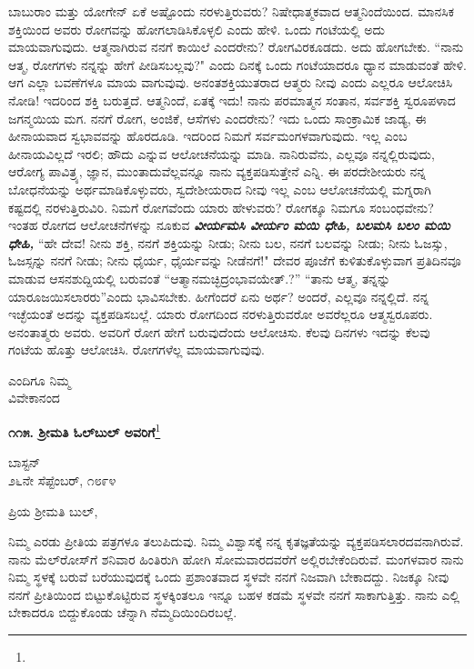 ಬಾಬುರಾಂ ಮತ್ತು ಯೋಗೇನ್ ಏಕೆ ಅಷ್ಟೊಂದು ನರಳುತ್ತಿರುವರು? ನಿಷೇಧಾತ್ಮಕವಾದ ಆತ್ಮನಿಂದೆಯಿಂದ. ಮಾನಸಿಕ ಶಕ್ತಿಯಿಂದ ಅವರು ರೋಗವನ್ನು ಹೋಗಲಾಡಿಸಿಕೊಳ್ಳಲಿ ಎಂದು ಹೇಳಿ. ಒಂದು ಗಂಟೆಯಲ್ಲಿ ಅದು ಮಾಯವಾಗುವುದು. ಆತ್ಮನಾಗಿರುವ ನನಗೆ ಕಾಯಿಲೆ ಎಂದರೇನು? ರೋಗವಿರಕೂಡದು. ಅದು ಹೋಗಬೇಕು. ``ನಾನು ಆತ್ಮ, ರೋಗಗಳು ನನ್ನನ್ನು ಹೇಗೆ ಪೀಡಿಸಬಲ್ಲವು?" ಎಂದು ದಿನಕ್ಕೆ ಒಂದು ಗಂಟೆಯಾದರೂ ಧ್ಯಾನ ಮಾಡುವಂತೆ ಹೇಳಿ. ಆಗ ಎಲ್ಲಾ ಬವಣೆಗಳೂ ಮಾಯ ವಾಗುವುವು. ಅನಂತಶಕ್ತಿಯುತರಾದ ಆತ್ಮರು ನೀವು ಎಂದು ಎಲ್ಲರೂ ಆಲೋಚಿಸಿ ನೋಡಿ! ಇದರಿಂದ ಶಕ್ತಿ ಬರುತ್ತದೆ. ಆತ್ಮನಿಂದೆ, ಏತಕ್ಕೆ ಇದು! ನಾನು ಪರಮಾತ್ಮನ ಸಂತಾನ, ಸರ್ವಶಕ್ತಿ ಸ್ವರೂಪಳಾದ ಜಗನ್ಮಯಿಯ ಮಗ. ನನಗೆ ರೋಗ, ಅಂಜಿಕೆ, ಆಸೆಗಳು ಎಂದರೇನು? ಇದು ಒಂದು ಸಾಂಕ್ರಾಮಿಕ ಜಾಡ್ಯ, ಈ ಹೀನಾಯವಾದ ಸ್ವಭಾವವನ್ನು ಹೊರದೂಡಿ. ಇದರಿಂದ ನಿಮಗೆ ಸರ್ವಮಂಗಳವಾಗುವುದು. ಇಲ್ಲ ಎಂಬ ಹೀನಾಯವಿಲ್ಲದೆ ಇರಲಿ; ಹೌದು ಎನ್ನುವ ಆಲೋಚನೆಯನ್ನು ಮಾಡಿ. ನಾನಿರುವೆನು, ಎಲ್ಲವೂ ನನ್ನಲ್ಲಿರುವುದು, ಆರೋಗ್ಯ ಪಾವಿತ್ರ್ಯ, ಜ್ಞಾನ, ಮುಂತಾದುವೆಲ್ಲವನ್ನೂ ನಾನು ವ್ಯಕ್ತಪಡಿಸುತ್ತೇನೆ ಎನ್ನಿ. ಈ ಪರದೇಶೀಯರು ನನ್ನ ಬೋಧನೆಯನ್ನು ಅರ್ಥಮಾಡಿಕೊಳ್ಳುವರು, ಸ್ವದೇಶೀಯರಾದ ನೀವು ಇಲ್ಲ ಎಂಬ ಆಲೋಚನೆಯಲ್ಲಿ ಮಗ್ನರಾಗಿ ಕಷ್ಟದಲ್ಲಿ ನರಳುತ್ತಿರುವಿರಿ. ನಿಮಗೆ ರೋಗವೆಂದು ಯಾರು ಹೇಳುವರು? ರೋಗಕ್ಕೂ ನಿಮಗೂ ಸಂಬಂಧವೇನು? ಇಂತಹ ರೋಗದ ಆಲೋಚನೆಗಳನ್ನು ನೂಕುವ\enginline{-} \textbf{\textit{ವೀರ್ಯಮಸಿ ವೀರ್ಯಂ ಮಯಿ ಧೇಹಿ, ಬಲಮಸಿ ಬಲಂ ಮಯಿ ಧೇಹಿ, }} ``ಹೇ ದೇವ! ನೀನು ಶಕ್ತಿ, ನನಗೆ ಶಕ್ತಿಯನ್ನು ನೀಡು; ನೀನು ಬಲ, ನನಗೆ ಬಲವನ್ನು ನೀಡು; ನೀನು ಓಜಸ್ಸು, ಓಜಸ್ಸನ್ನು ನನಗೆ ನೀಡು; ನೀನು ಧೈರ್ಯ, ಧೈರ್ಯವನ್ನು ನೀಡೆನಗೆ!" ದೇವರ ಪೂಜೆಗೆ ಕುಳಿತುಕೊಳ್ಳುವಾಗ ಪ್ರತಿದಿನವೂ ಮಾಡುವ ಆಸನಶುದ್ದಿಯಲ್ಲಿ ಬರುವಂತೆ ``ಆತ್ಮಾನಮಚ್ಛಿದ್ರಂಭಾವಯೇತ್.?” ``ತಾನು ಆತ್ಮ, ತನ್ನನ್ನು ಯಾರೂಜಯಿಸಲಾರರು''ಎಂದು ಭಾವಿಸಬೇಕು. ಹೀಗೆಂದರೆ ಏನು ಅರ್ಥ? ಅಂದರೆ, ಎಲ್ಲವೂ ನನ್ನಲ್ಲಿದೆ. ನನ್ನ ಇಚ್ಛೆಯಂತೆ ಅದನ್ನು ವ್ಯಕ್ತಪಡಿಸಬಲ್ಲೆ. ಯಾರು ರೋಗದಿಂದ ನರಳುತ್ತಿರುವರೋ ಅವರೆಲ್ಲರೂ ಆತ್ಮಸ್ವರೂಪರು. ಅನಂತಾತ್ಮರು ಅವರು. ಅವರಿಗೆ ರೋಗ ಹೇಗೆ ಬರುವುದೆಂದು ಆಲೋಚಿಸು. ಕೆಲವು ದಿನಗಳು ಇದನ್ನು ಕೆಲವು ಗಂಟೆಯ ಹೊತ್ತು ಆಲೋಚಿಸಿ. ರೋಗಗಳೆಲ್ಲ ಮಾಯವಾಗುವುವು.

{\flushright
ಎಂದಿಗೂ ನಿಮ್ಮ\\ವಿವೇಕಾನಂದ\par}

\newpage

\begin{center}
\textbf{೧೧೫. ಶ‍್ರೀಮತಿ ಓಲ್‌ಬುಲ್‌ ಅವರಿಗೆ}\footnote{}
\end{center}

\begin{flushright}
ಬಾಸ್ಟನ್\\೨೬ನೇ ಸೆಪ್ಟೆಂಬರ್, ೧೮೯೪
\end{flushright}

\noindent
ಪ್ರಿಯ ಶ‍್ರೀಮತಿ ಬುಲ್,

ನಿಮ್ಮ ಎರಡು ಪ್ರೀತಿಯ ಪತ್ರಗಳೂ ತಲುಪಿದುವು. ನಿಮ್ಮ ವಿಶ್ವಾಸಕ್ಕೆ ನನ್ನ ಕೃತಜ್ಞತೆಯನ್ನು ವ್ಯಕ್ತಪಡಿಸಲಾರದವನಾಗಿರುವೆ. ನಾನು ಮೆಲ್‌ರೋಸ್‌ಗೆ ಶನಿವಾರ ಹಿಂತಿರುಗಿ ಹೋಗಿ ಸೋಮವಾರದವರೆಗೆ ಅಲ್ಲಿರಬೇಕೆಂದಿರುವೆ. ಮಂಗಳವಾರ ನಾನು ನಿಮ್ಮ ಸ್ಥಳಕ್ಕೆ ಬರುವೆ\enginline{-} ಬರೆಯುವುದಕ್ಕೆ ಒಂದು ಪ್ರಶಾಂತವಾದ ಸ್ಥಳವೇ ನನಗೆ ನಿಜವಾಗಿ ಬೇಕಾದದ್ದು. ನಿಜಕ್ಕೂ ನೀವು ನನಗೆ ಪ್ರೀತಿಯಿಂದ ಬಿಟ್ಟುಕೊಟ್ಟಿರುವ ಸ್ಥಳಕ್ಕಿಂತಲೂ ಇನ್ನೂ ಬಹಳ ಕಡಮೆ ಸ್ಥಳವೇ ನನಗೆ ಸಾಕಾಗುತ್ತಿತ್ತು. ನಾನು ಎಲ್ಲಿ ಬೇಕಾದರೂ ಬಿದ್ದುಕೊಂಡು ಚೆನ್ನಾಗಿ ನೆಮ್ಮದಿಯಿಂದಿರಬಲ್ಲೆ.

